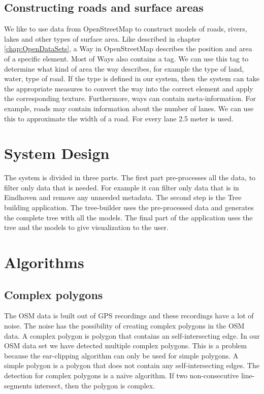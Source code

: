 \subsection{Constructing roads and surface areas}
We like to use data from OpenStreetMap to construct models of roads, rivers, lakes and other types of surface area. Like described in chapter \ref{chap:OpenDataSets}, a Way in OpenStreetMap describes the position and area of a specific element. Most of Ways also contains a tag. We can use this tag to determine what kind of area the way describes, for example the type of land, water, type of road. If the type is defined in our system, then the system can take the appropriate measures to convert the way into the correct element and apply the corresponding texture. Furthermore, ways can contain meta-information. For example, roads may contain information about the number of lanes. We can use this to approximate the width of a road. For every lane 2.5 meter is used.

\section{System Design}
\label{sec:SystemDesign}
The system is divided in three parts. The first part pre-processes all the data, to filter only data that is needed. For example it can filter only data that is in Eindhoven and remove any unneeded metadata. The second step is the Tree building application. The tree-builder uses the pre-processed data and generates the complete tree with all the models. The final part of the application uses the tree and the models to give visualization to the user.

\section{Algorithms}
\label{sec:Algorithms}



\subsection{Complex polygons}
\label{subsec:ComplexPolygons}
The OSM data is built out of GPS recordings and these recordings have a lot of noise. The noise has the possibility of creating complex polygons in the OSM data. A complex polygon is polygon that contains an self-intersecting edge. In our OSM data set we have detected multiple complex polygons. This is a problem because the ear-clipping algorithm can only be used for simple polygons. A simple polygon is a polygon that does not contain any self-intersecting edges. The detection for complex polygons is a naïve algorithm. If two non-consecutive line-segments intersect, then the polygon is complex.

